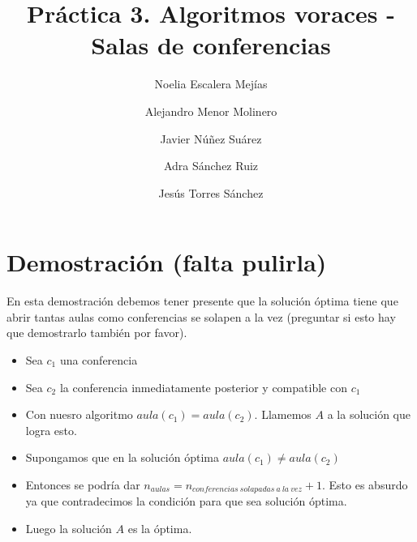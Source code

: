 \documentclass{article}
\title{Práctica 3. Algoritmos voraces - Salas de conferencias}
\author{Noelia Escalera Mejías \\
	\and Alejandro Menor Molinero \\
	\and Javier Núñez Suárez \\
	\and Adra Sánchez Ruiz \\
	\and Jesús Torres Sánchez}
\begin{document}
	\maketitle
	
	\section{Demostración (falta pulirla)}
	En esta demostración debemos tener presente que la solución óptima tiene que abrir tantas aulas como conferencias se solapen a la vez (preguntar si esto hay que demostrarlo también por favor).
	\begin{itemize}
		
		\item Sea $c_1$ una conferencia
		\item Sea $c_2$ la conferencia inmediatamente posterior y compatible con $c_1$
		\item Con nuesro algoritmo $aula(c_1)=aula(c_2)$. Llamemos $A$ a la solución que logra esto.
		\item Supongamos que en la solución óptima $aula(c_1) \neq aula(c_2)$
		\item Entonces se podría dar $n_{aulas}=n_{conferencias\ solapadas\ a\ la\ vez}+1$. Esto es absurdo ya que contradecimos la condición para que sea solución óptima.
		\item Luego la solución $A$ es la óptima.
	\end{itemize}
	
	
\end{document}
